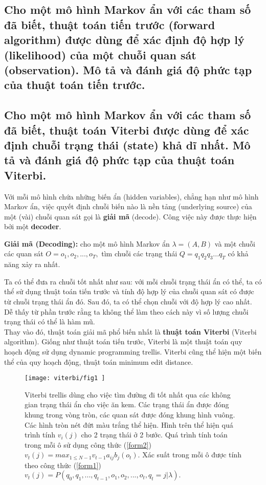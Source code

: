 \subsection{Cho một mô hình Markov ẩn với các tham số đã biết, thuật toán tiến trước (forward algorithm) được dùng để xác định độ hợp lý (likelihood) của một chuỗi quan sát (observation). Mô tả và đánh giá độ phức tạp của thuật toán tiến trước.}

\subsection{Cho một mô hình Markov ẩn với các tham số đã biết, thuật toán Viterbi được dùng để xác định chuỗi trạng thái (state) khả dĩ nhất. Mô tả và đánh giá độ phức tạp của thuật toán Viterbi.}
Với mỗi mô hình chứa những biến ẩn (hidden variables), chẳng hạn như mô hình Markov ẩn, việc quyết định chuỗi biến nào là nền tảng (underlying source) của một (vài) chuỗi quan sát gọi là \textbf{giải mã} (decode). Công việc này được thực hiện bởi một \textbf{decoder}.\\
\begin{mybox}
\textbf{Giải mã (Decoding):} cho một mô hình Markov ẩn $\lambda = \left( {A, B} \right)$ và một chuỗi các quan sát $O = o_1, o_2, ..., o_T,$ tìm chuỗi các trạng thái $Q = {q_1}{q_2}{q_3}...{q_T}$ có khả năng xảy ra nhất.
\end{mybox}
Ta có thể đưa ra chuỗi tốt nhất như sau: với mỗi chuỗi trạng thái ẩn có thể, ta có thể sử dụng thuật toán tiến trước và tính độ hợp lý của chuỗi quan sát có được từ chuỗi trạng thái ẩn đó. Sau đó, ta có thể chọn chuỗi với độ hợp lý cao nhất. Dễ thấy từ phần trước rằng ta không thể làm theo cách này vì số lượng chuỗi trạng thái có thể là hàm mũ.\\
Thay vào đó, thuật toán giải mã phổ biến nhất là \textbf{thuật toán Viterbi} (Viterbi algorithm). Giống như thuật toán tiến trước, Viterbi là một thuật toán quy hoạch động sử dụng dynamic programming trellis. Viterbi cũng thể hiện một biến thể của quy hoạch động, thuật toán minimum edit distance.
\begin{figure}[H]
\begin{center}
\texttt{[image: viterbi/fig1 ]}
\end{center}
\caption{Viterbi trellis dùng cho việc tìm đường đi tốt nhất qua các không gian trạng thái ẩn cho việc ăn kem. Các trạng thái ẩn được đóng khung trong vòng tròn, các quan sát được đóng khung hình vuông. Các hình tròn nét đứt màu trắng thể hiện. Hình trên thể hiện quá trình tính $v_i \left( j \right)$ cho 2 trạng thái ở 2 bước. Quá trình tính toán trong mỗi ô sử dụng công thức (\ref{form2}) $v_t \left( j \right) = max_{1 \leqslant N - 1}v_{t - 1}a_{ij}b_j \left( {o_t} \right)$. Xác suất trong mỗi ô được tính theo công thức (\ref{form1}) $v_t \left( j \right) = P \left( {q_0, q_1, ..., q_{t - 1}, o_1, o_2, ..., o_t, q_t = \left. j \right|\lambda} \right).$ \label{viterbi_fig1}}
\end{figure}
